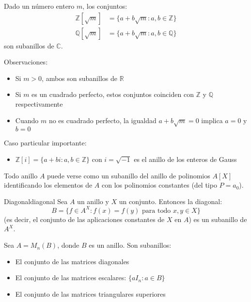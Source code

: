 \begin{example}{}{}
    Dado un número entero \(m\), los conjuntos:
    \begin{align*}
        \mathbb{Z}[\sqrt{m}] &= \{a + b\sqrt{m} : a, b \in \mathbb{Z}\} \\
        \mathbb{Q}[\sqrt{m}] &= \{a + b\sqrt{m} : a, b \in \mathbb{Q}\}
    \end{align*}
    son subanillos de \(\mathbb{C}\).
    
    Observaciones:
    \begin{itemize}
        \item Si \(m > 0\), ambos son subanillos de \(\mathbb{R}\)
        \item Si \(m\) es un cuadrado perfecto, estos conjuntos coinciden con \(\mathbb{Z}\) y \(\mathbb{Q}\) respectivamente
        \item Cuando \(m\) no es cuadrado perfecto, la igualdad \(a + b\sqrt{m} = 0\) implica \(a = 0\) y \(b = 0\)
    \end{itemize}
    
    Caso particular importante:
    \begin{itemize}
        \item \(\mathbb{Z}[i] = \{a + bi : a, b \in \mathbb{Z}\}\) con \(i = \sqrt{-1}\) es el {anillo de los enteros de Gauss}
    \end{itemize}
\end{example}

\begin{example}{}{}
    Todo anillo \(A\) puede verse como un subanillo del anillo de polinomios \(A[X]\) identificando los elementos de \(A\) con los {polinomios constantes} (del tipo \(P = a_0\)).
\end{example}

\begin{example}{Diagonal}{diagonal}
    Sea \(A\) un anillo y \(X\) un conjunto. Entonces la {diagonal}:
    \[
    B = \{f \in A^X : f(x) = f(y) \text{ para todo } x, y \in X\}
    \]
    (es decir, el conjunto de las {aplicaciones constantes} de \(X\) en \(A\)) es un subanillo de \(A^X\).
\end{example}

\begin{example}{}{}
    Sea \(A = M_n(B)\), donde \(B\) es un anillo. Son subanillos:
    \begin{itemize}
        \item El conjunto de las matrices diagonales
        \item El conjunto de las matrices escalares: \(\{a I_n : a \in B\}\)
        \item El conjunto de las matrices triangulares superiores
    \end{itemize}
\end{example}

